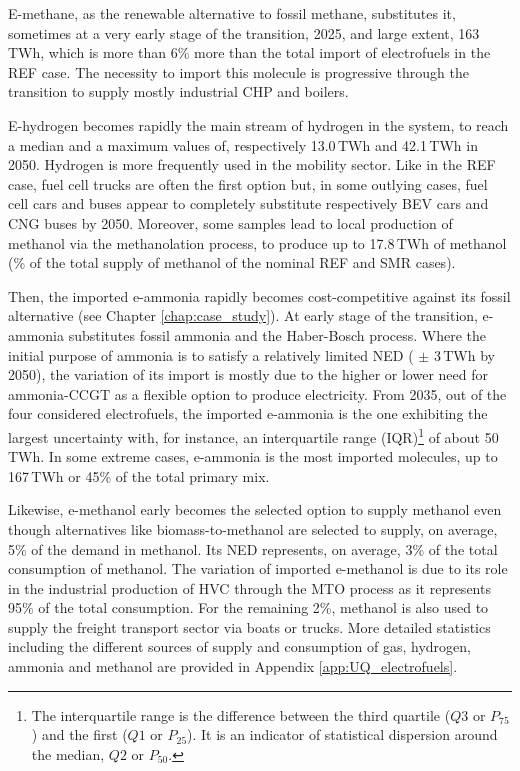 E-methane, as the renewable alternative to fossil methane, substitutes it, sometimes at a very early stage of the transition, 2025, and large extent, 163\,TWh, which is more than 6\% more than the total import of electrofuels in the REF case. The necessity to import this molecule is progressive through the transition to supply mostly industrial \gls{CHP} and boilers. 

E-hydrogen becomes rapidly the main stream of hydrogen in the system, to reach a median and a maximum values of, respectively 13.0\,TWh and 42.1\,TWh in 2050. Hydrogen is more frequently used in the mobility sector. Like in the REF case, fuel cell trucks are often the first option but, in some outlying cases, fuel cell cars and buses appear to completely substitute respectively \gls{BEV} cars and \gls{CNG} buses by 2050. Moreover, some samples lead to local production of methanol via the methanolation process, to produce up to 17.8\,TWh of methanol (\% of the total supply of methanol of the nominal REF and SMR cases). 

Then, the imported e-ammonia rapidly becomes cost-competitive against its fossil alternative (see Chapter \ref{chap:case_study}). At early stage of the transition, e-ammonia substitutes fossil ammonia and the Haber-Bosch process. Where the initial purpose of ammonia is to satisfy a relatively limited \acrfull{NED} ( $\pm$ 3\,TWh by 2050), the variation of its import is mostly due to the higher or lower need for ammonia-\gls{CCGT} as a flexible option to produce electricity. From 2035, out of the four considered electrofuels, the imported e-ammonia is the one exhibiting the largest uncertainty with, for instance, an interquartile range (IQR)\footnote{The interquartile range is the difference between the third quartile ($Q3$ or $P_{75}$) and the first ($Q1$ or $P_{25}$). It is an indicator of statistical dispersion around the median, $Q2$ or $P_{50}$.} of about 50\,TWh. In some extreme cases, e-ammonia is the most imported molecules, \ie up to 167\,TWh or 45\% of the total primary mix. 

Likewise, e-methanol early becomes the selected option to supply methanol even though alternatives like biomass-to-methanol are selected to supply, on average, 5\% of the demand in methanol. Its \gls{NED} represents, on average, 3\% of the total consumption of methanol. The variation of imported e-methanol is due to its role in the industrial production of \gls{HVC} through the \acrfull{MTO} process as it represents 95\% of the total consumption. For the remaining 2\%, methanol is also used to supply the freight transport sector via boats or trucks. More detailed statistics including the different sources of supply and consumption of gas, hydrogen, ammonia and methanol are provided in Appendix \ref{app:UQ_electrofuels}.\\

